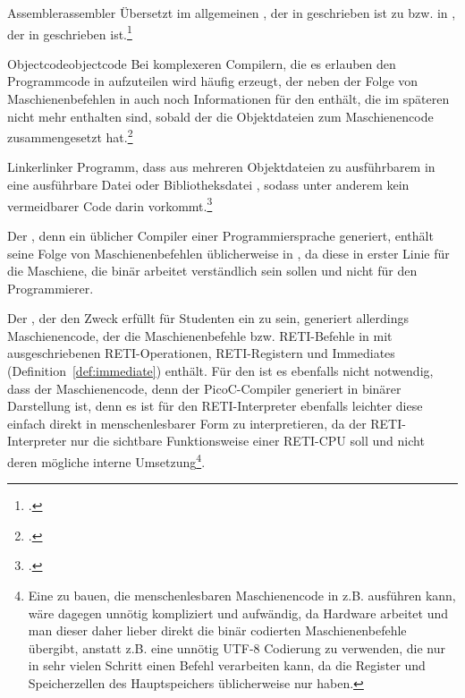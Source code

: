 \begin{Definition}{Assembler}{assembler}
  Übersetzt im allgemeinen , der in  geschrieben ist zu  bzw.  in , der in  geschrieben ist.\footcite{scholl_einfuhrung_2021}
\end{Definition}

\begin{Definition}{Objectcode}{objectcode}
  Bei komplexeren Compilern, die es erlauben den Programmcode in  aufzuteilen wird häufig  erzeugt, der neben der Folge von Maschienenbefehlen in  auch noch Informationen für den  enthält, die im späteren  nicht mehr enthalten sind, sobald der  die Objektdateien zum Maschienencode zusammengesetzt hat.\footcite{scholl_einfuhrung_2021}
\end{Definition}

\begin{Definition}{Linker}{linker}
  Programm, dass  aus mehreren Objektdateien zu ausführbarem  in eine ausführbare Datei oder Bibliotheksdatei , sodass unter anderem kein vermeidbarer  Code darin vorkommt.\footcite{scholl_einfuhrung_2021}
\end{Definition}

Der , denn ein üblicher Compiler einer Programmiersprache generiert, enthält seine Folge von Maschienenbefehlen üblicherweise in , da diese in erster Linie für die Maschiene, die binär arbeitet verständlich sein sollen und nicht für den Programmierer.

Der , der den Zweck erfüllt für Studenten ein  zu sein, generiert allerdings Maschienencode, der die Maschienenbefehle bzw. RETI-Befehle in  mit ausgeschriebenen RETI-Operationen, RETI-Registern und Immediates (Definition~\ref{def:immediate}) enthält. Für den  ist es ebenfalls nicht notwendig, dass der Maschienencode, denn der PicoC-Compiler generiert in binärer Darstellung ist, denn es ist für den RETI-Interpreter ebenfalls leichter diese einfach direkt in menschenlesbarer Form zu interpretieren, da der RETI-Interpreter nur die sichtbare Funktionsweise einer RETI-CPU  soll und nicht deren mögliche interne Umsetzung\footnote{Eine  zu bauen, die menschenlesbaren Maschienencode in z.B.  ausführen kann, wäre dagegen unnötig kompliziert und aufwändig, da Hardware  arbeitet und man dieser daher lieber direkt die binär codierten Maschienenbefehle übergibt, anstatt z.B. eine unnötig  UTF-8 Codierung zu verwenden, die nur in sehr vielen Schritt einen Befehl verarbeiten kann, da die Register und Speicherzellen des Hauptspeichers üblicherweise nur  haben.}.

